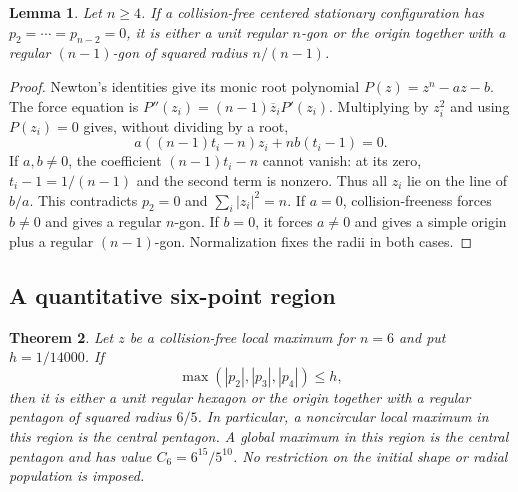 \documentclass[11pt]{article}
\newtheorem{theorem}{Theorem}[section]
\newtheorem{lemma}[theorem]{Lemma}
\theoremstyle{remark}
\numberwithin{equation}{section}
\begin{document}
\begin{lemma}\label{lem:noclass-zero-harmonics}
Let $n\ge4$. If a collision-free centered stationary configuration
has $p_2=\cdots=p_{n-2}=0$, it is either a unit regular $n$-gon or
the origin together with a regular $(n-1)$-gon of squared radius
$n/(n-1)$.
\end{lemma}
\begin{proof}
Newton's identities give its monic root polynomial
$P(z)=z^n-a z-b$. The force equation is
$P''(z_i)=(n-1)\overline z_i P'(z_i)$. Multiplying by $z_i^2$ and
using $P(z_i)=0$ gives, without dividing by a root,
\[
                  a((n-1)t_i-n)z_i+n b(t_i-1)=0.
\]
If $a,b\ne0$, the coefficient $(n-1)t_i-n$ cannot vanish:
at its zero, $t_i-1=1/(n-1)$ and the second term is nonzero.
Thus all $z_i$ lie on the line of $b/a$. This contradicts
$p_2=0$ and $\sum_i|z_i|^2=n$. If $a=0$, collision-freeness forces
$b\ne0$ and gives a regular $n$-gon. If $b=0$, it forces $a\ne0$
and gives a simple origin plus a regular $(n-1)$-gon. Normalization
fixes the radii in both cases.
\end{proof}

\subsection{A quantitative six-point region}

\begin{theorem}\label{thm:noclass-small6}
Let $z$ be a collision-free local maximum for $n=6$ and put
$h=1/14000$. If
\[
                   \max(|p_2|,|p_3|,|p_4|)\le h,
\]
then it is either a unit regular hexagon or the origin together
with a regular pentagon of squared radius $6/5$.
In particular, a noncircular local maximum in this region is the
central pentagon. A global maximum in this region is the central
pentagon and has value $C_6=6^{15}/5^{10}$.
No restriction on the initial shape or radial population is imposed.
\end{theorem}
\end{document}
